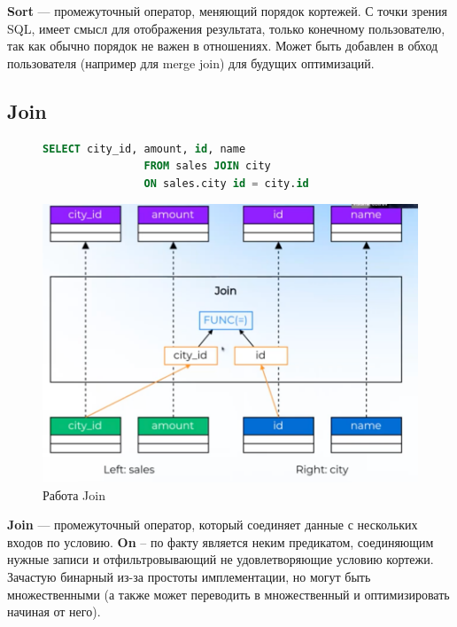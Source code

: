 \documentclass[11pt]{article}
\begin{document}
    \textbf{Sort} --- промежуточный оператор, меняющий порядок кортежей.
    С точки зрения SQL, имеет смысл для отображения результата, только конечному пользователю, так как обычно порядок не важен в отношениях.
    Может быть добавлен в обход пользователя (например для merge join) для будущих оптимизаций.

    \newpage

    \subsection{Join}

    \begin{figure}[h!]
        \begin{minipage}{0.4\textwidth}
            \begin{lstlisting}[language=SQL, caption={SQL приводящий в Join}]
                SELECT city_id, amount, id, name
                FROM sales JOIN city
                ON sales.city id = city.id
            \end{lstlisting}
        \end{minipage}
        \begin{minipage}{0.6\textwidth}
            \centering
            \includegraphics[width=\textwidth]{Pictures/Operators/Join}
            \caption{Работа Join}
        \end{minipage}
    \end{figure}

    \textbf{Join} --- промежуточный оператор, который соединяет данные с нескольких входов по условию.
    \textbf{On} -- по факту является неким предикатом, соединяющим нужные записи и отфильтровывающий не удовлетворяющие условию кортежи.
    Зачастую бинарный из-за простоты имплементации, но могут быть множественными (а также может переводить в множественный и оптимизировать начиная от него).
\end{document}
